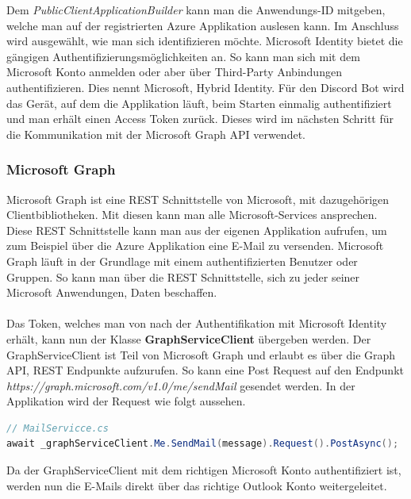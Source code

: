 \documentclass[a4paper, table]{article}
\begin{document}
Dem \textit{PublicClientApplicationBuilder} kann man die Anwendungs-ID mitgeben, welche man auf der registrierten Azure Applikation auslesen kann. 
Im Anschluss wird ausgewählt, wie man sich identifizieren möchte. 
Microsoft Identity bietet die gängigen Authentifizierungsmöglichkeiten an. 
So kann man sich mit dem Microsoft Konto anmelden oder aber über Third-Party Anbindungen authentifizieren. 
Dies nennt Microsoft, Hybrid Identity.\autocite{billmath_what_nodate}
Für den Discord Bot wird das Gerät, auf dem die Applikation läuft, beim Starten einmalig authentifiziert und man erhält einen Access Token zurück. 
Dieses wird im nächsten Schritt für die Kommunikation mit der Microsoft Graph API verwendet.

\subsubsection*{Microsoft Graph}
Microsoft Graph ist eine \gls{REST} Schnittstelle von Microsoft, mit dazugehörigen Clientbibliotheken. 
Mit diesen kann man alle Microsoft-Services ansprechen. \autocite{angelgolfer-ms_microsoft_nodate}
Diese REST Schnittstelle kann man aus der eigenen Applikation aufrufen, um zum Beispiel über die Azure Applikation eine E-Mail zu versenden. 
Microsoft Graph läuft in der Grundlage mit einem authentifizierten Benutzer oder Gruppen. 
So kann man über die REST Schnittstelle, sich zu jeder seiner Microsoft Anwendungen, Daten beschaffen.\\\\
Das Token, welches man von nach der Authentifikation mit Microsoft Identity erhält, kann nun der Klasse \textbf{GraphServiceClient} übergeben werden. 
Der GraphServiceClient ist Teil von Microsoft Graph und erlaubt es über die Graph API, REST Endpunkte aufzurufen. 
So kann eine Post Request auf den Endpunkt \textit{https://graph.microsoft.com/v1.0/me/sendMail} gesendet werden. 
In der Applikation wird der Request wie folgt aussehen.

\begin{lstlisting}[language=csharp]
// MailServicce.cs
await _graphServiceClient.Me.SendMail(message).Request().PostAsync();
\end{lstlisting}

Da der GraphServiceClient mit dem richtigen Microsoft Konto authentifiziert ist, werden nun die E-Mails direkt über das richtige Outlook Konto weitergeleitet.
\end{document}
